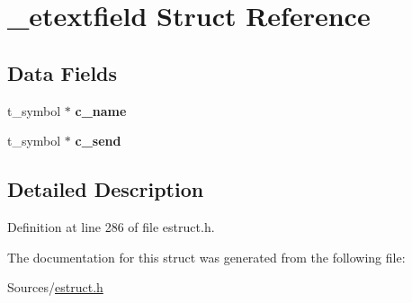 \hypertarget{struct__etextfield}{\section{\-\_\-etextfield Struct Reference}
\label{struct__etextfield}
}
\subsection*{Data Fields}
\begin{DoxyCompactItemize}
\item 
\hypertarget{struct__etextfield_a6b1d595c3eed41231261cc949de6c059}{t\-\_\-symbol $\ast$ {\bfseries c\-\_\-name}}\label{struct__etextfield_a6b1d595c3eed41231261cc949de6c059}

\item 
\hypertarget{struct__etextfield_a8b8515ab22b24ef7b726fc06af1254fe}{t\-\_\-symbol $\ast$ {\bfseries c\-\_\-send}}\label{struct__etextfield_a8b8515ab22b24ef7b726fc06af1254fe}

\end{DoxyCompactItemize}


\subsection{Detailed Description}


Definition at line 286 of file estruct.\-h.



The documentation for this struct was generated from the following file\-:\begin{DoxyCompactItemize}
\item 
Sources/\hyperlink{estruct_8h}{estruct.\-h}\end{DoxyCompactItemize}

